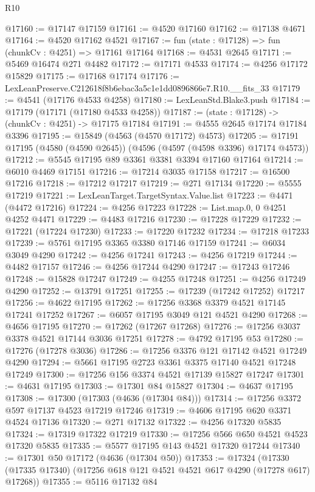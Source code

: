 \begin{lexlean}{R10}
\begin{coremodule}
@17160 := @17147 @17159
@17161 := @4520 @17160
@17162 := @17138 @4671
@17164 := @4520 @17162 @4521
@17167 := fun (state : @17128) => fun (chunkCv : @4251) => @17161 @17164
@17168 := @4531 @2645
@17171 := @5469 @16474 @271 @4482
@17172 := @17171 @4533
@17174 := @4256 @17172 @15829
@17175 := @17168 @17174
@17176 := LexLeanPreserve.C212618f8b6ebac3a5c1e1dd0896866e7.R10.__fits_33
@17179 := @4541 (@17176 @4533 @4258)
@17180 := LexLeanStd.Blake3.push
@17184 := @17179 (@17171 (@17180 @4533 @4258))
@17187 := (state : @17128) -> (chunkCv : @4251) -> @17175 @17184
@17191 := @4555 @2645 @17174 @17184 @3396
@17195 := @15849 (@4563 (@4570 @17172) @4573)
@17205 := @17191 @17195 (@4580 (@4590 @2645)) (@4596 (@4597 (@4598 @3396) @17174 @4573))
@17212 := @5545 @17195 @89 @3361 @3381 @3394 @17160 @17164
@17214 := @6010 @4469 @17151
@17216 := @17214 @3035 @17158
@17217 := @16500 @17216
@17218 := @17212 @17217
@17219 := @271 @17134
@17220 := @5555 @17219
@17221 := LexLeanTarget.TargetSyntax.Value.list
@17223 := @4471 (@4472 @17216)
@17224 := @4256 @17223
@17228 := List.map.{0, 0} @4251 @4252 @4471
@17229 := @4483 @17216
@17230 := @17228 @17229
@17232 := @17221 (@17224 @17230)
@17233 := @17220 @17232
@17234 := @17218 @17233
@17239 := @5761 @17195 @3365 @3380 @17146 @17159
@17241 := @6034 @3049 @4290
@17242 := @4256 @17241
@17243 := @4256 @17219
@17244 := @4482 @17157
@17246 := @4256 @17244 @4290
@17247 := @17243 @17246
@17248 := @15828 @17247
@17249 := @4255 @17248
@17251 := @4256 @17249 @4290
@17252 := @13791 @17251
@17255 := @17239 (@17242 @17252) @17217
@17256 := @4622 @17195
@17262 := @17256 @3368 @3379 @4521 @17145 @17241 @17252
@17267 := @6057 @17195 @3049 @121 @4521 @4290
@17268 := @4656 @17195
@17270 := @17262 (@17267 @17268)
@17276 := @17256 @3037 @3378 @4521 @17144 @3036 @17251
@17278 := @4792 @17195 @53
@17280 := @17276 (@17278 @3036)
@17286 := @17256 @3376 @121 @17142 @4521 @17249 @4290
@17294 := @5661 @17195 @2723 @3361 @3375 @17140 @4521 @17248 @17249
@17300 := @17256 @156 @3374 @4521 @17139 @15827 @17247
@17301 := @4631 @17195
@17303 := @17301 @84 @15827
@17304 := @4637 @17195
@17308 := @17300 (@17303 (@4636 (@17304 @84)))
@17314 := @17256 @3372 @597 @17137 @4523 @17219 @17246
@17319 := @4606 @17195 @620 @3371 @4524 @17136
@17320 := @271 @17132
@17322 := @4256 @17320 @5835
@17324 := @17319 @17322 @17219
@17330 := @17256 @566 @650 @4521 @4523 @17320 @5835
@17335 := @5577 @17195 @143 @4521 @17320 @17244
@17340 := @17301 @50 @17172 (@4636 (@17304 @50))
@17353 := @17324
    (@17330 (@17335 @17340) (@17256 @618 @121 @4521 @4521 @617 @4290 (@17278 @617) @17268))
@17355 := @5116 @17132 @84

\end{coremodule}
\end{lexlean}
